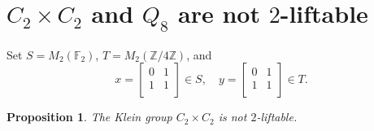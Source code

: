 \documentclass[12pt]{amsart}
\numberwithin{equation}{section}
\newtheorem{proposition}[equation]{Proposition}
\theoremstyle{definition}
\renewcommand{\(}{\bigl(}
\renewcommand{\)}{\bigr)}
\newcommand{\F}{\mathbb{F}}
\newcommand{\Z}{\mathbb{Z}}
\begin{document}
\section{$C_2 \times C_2$ and $Q_8$ are not $2$-liftable}

Set $S=M_2(\F_2)$,  $T=M_2(\Z/4\Z)$,  and
\[
x=\begin{bmatrix}
  0 &   1\\
 1  & 1\\
 \end{bmatrix}\in S, \quad
y=\begin{bmatrix}
  0 &   1\\
 1  & 1\\
 \end{bmatrix}\in T.
 \]

\begin{proposition}\label{v4}
The Klein group $C_2 \times C_2$ is not $2$-liftable.
\end{proposition}
\end{document}

